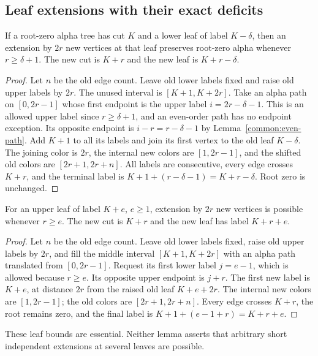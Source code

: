 \subsection{Leaf extensions with their exact deficits}
\begin{lemma}\label{common:lower-leaf-extension}
If a root-zero alpha tree has cut $K$ and a lower leaf of label
$K-\delta$, then an extension by $2r$ new vertices at that leaf
preserves root-zero alpha whenever $r\ge\delta+1$. The new cut is
$K+r$ and the new leaf is $K+r-\delta$.
\end{lemma}
\begin{proof}
Let $n$ be the old edge count. Leave old lower labels fixed and raise old upper labels by $2r$.
The unused interval is $[K+1,K+2r]$. Take an alpha path on
$[0,2r-1]$ whose first endpoint is the upper label
$i=2r-\delta-1$. This is an allowed upper label since
$r\ge\delta+1$, and an even-order path has no endpoint exception.
Its opposite endpoint is $i-r=r-\delta-1$ by
Lemma~\ref{common:even-path}. Add $K+1$ to all its labels and
join its first vertex to the old leaf $K-\delta$. The joining
color is $2r$, the internal new colors are $[1,2r-1]$, and the
shifted old colors are $[2r+1,2r+n]$. All labels are consecutive,
every edge crosses $K+r$, and the terminal label is
$K+1+(r-\delta-1)=K+r-\delta$. Root zero is unchanged.
\end{proof}

\begin{lemma}\label{common:upper-leaf-extension}
For an upper leaf of label $K+e$, $e\ge1$, extension by $2r$ new
vertices is possible whenever $r\ge e$. The new cut is $K+r$ and
the new leaf has label $K+r+e$.
\end{lemma}
\begin{proof}
Let $n$ be the old edge count. Leave old lower labels fixed, raise old upper labels by
$2r$, and fill the middle interval $[K+1,K+2r]$ with an alpha
path translated from $[0,2r-1]$. Request its first lower label
$j=e-1$, which is allowed because $r\ge e$. Its opposite upper
endpoint is $j+r$. The first new label is $K+e$, at distance
$2r$ from the raised old leaf $K+e+2r$. The internal new colors
are $[1,2r-1]$; the old colors are $[2r+1,2r+n]$. Every edge
crosses $K+r$, the root remains zero, and the final label is
$K+1+(e-1+r)=K+r+e$.
\end{proof}

These leaf bounds are essential. Neither lemma asserts that arbitrary
short independent extensions at several leaves are possible.
